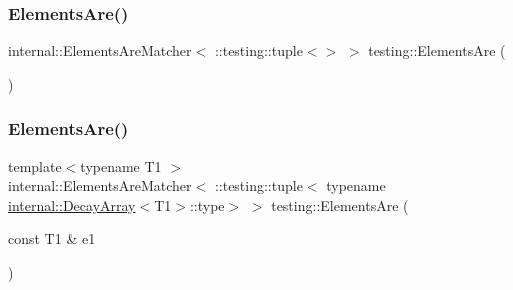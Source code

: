 \mbox{\label{namespacetesting_a79cf4ae694bf8231dcf283b325405f27}} 
\subsubsection{\texorpdfstring{ElementsAre()}{ElementsAre()}\hspace{0.1cm}{\footnotesize\ttfamily [1/11]}}
{\footnotesize\ttfamily internal\+::\+Elements\+Are\+Matcher$<$ \+::testing\+::tuple$<$$>$ $>$ testing\+::\+Elements\+Are (\begin{DoxyParamCaption}{ }\end{DoxyParamCaption})\hspace{0.3cm}{\ttfamily [inline]}}

\mbox{\label{namespacetesting_aa35aa6c9638d989e9f4aaa6009f60589}} 
\subsubsection{\texorpdfstring{ElementsAre()}{ElementsAre()}\hspace{0.1cm}{\footnotesize\ttfamily [2/11]}}
{\footnotesize\ttfamily template$<$typename T1 $>$ \\
internal\+::\+Elements\+Are\+Matcher$<$ \+::testing\+::tuple$<$ typename \mbox{\hyperlink{structtesting_1_1internal_1_1_decay_array}{internal\+::\+Decay\+Array}}$<$T1$>$\+::type$>$ $>$ testing\+::\+Elements\+Are (\begin{DoxyParamCaption}\item[{const T1 \&}]{e1 }\end{DoxyParamCaption})\hspace{0.3cm}{\ttfamily [inline]}}

\mbox{\label{namespacetesting_a864f77fe7774308d4c54f1f52f9040cf}} 

